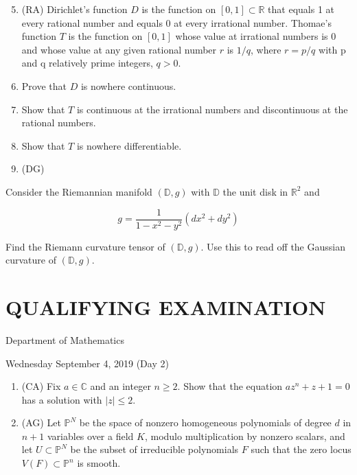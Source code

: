 \documentclass[10pt]{article}
\begin{document}
\begin{enumerate}
  \setcounter{enumi}{4}
  \item (RA) Dirichlet's function $D$ is the function on $[0,1] \subset \mathbb{R}$ that equals 1 at every rational number and equals 0 at every irrational number. Thomae's function $T$ is the function on $[0,1]$ whose value at irrational numbers is 0 and whose value at any given rational number $r$ is $1 / q$, where $r=p / q$ with $\mathrm{p}$ and q relatively prime integers, $q>0$.

  \item Prove that $D$ is nowhere continuous.

  \item Show that $T$ is continuous at the irrational numbers and discontinuous at the rational numbers.

  \item Show that $T$ is nowhere differentiable.

  \item (DG)

\end{enumerate}

Consider the Riemannian manifold $(\mathbb{D}, g)$ with $\mathbb{D}$ the unit disk in $\mathbb{R}^{2}$ and

$$
g=\frac{1}{1-x^{2}-y^{2}}\left(d x^{2}+d y^{2}\right)
$$

Find the Riemann curvature tensor of $(\mathbb{D}, g)$. Use this to read off the Gaussian curvature of $(\mathbb{D}, g)$.

\section*{QUALIFYING EXAMINATION }
Department of Mathematics

Wednesday September 4, 2019 (Day 2)

\begin{enumerate}
  \item (CA) Fix $a \in \mathbb{C}$ and an integer $n \geq 2$. Show that the equation $a z^{n}+z+1=0$ has a solution with $|z| \leq 2$.

  \item (AG) Let $\mathbb{P}^{N}$ be the space of nonzero homogeneous polynomials of degree $d$ in $n+1$ variables over a field $K$, modulo multiplication by nonzero scalars, and let $U \subset \mathbb{P}^{N}$ be the subset of irreducible polynomials $F$ such that the zero locus $V(F) \subset \mathbb{P}^{n}$ is smooth.

\end{enumerate}
\end{document}
